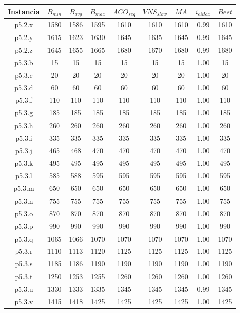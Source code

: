 \begin{table}
\begin{center}
\begin{tabular}{ |c|c|c|c|c|c|c|c|c| } 
\hline
Instancia & $B_{min}$ & $B_{avg}$ & $B_{max}$ & $ACO_{seq}$ & $VNS_{slow}$ & $MA$ & $i_{eMax}$ & $Best$ \\
\hline
p5.2.x & 1580 & 1586 & 1595 & 1610 & 1610 & 1610 & 0.99 & 1610 \\
p5.2.y & 1615 & 1623 & 1630 & 1645 & 1635 & 1645 & 0.99 & 1645 \\
p5.2.z & 1645 & 1655 & 1665 & 1680 & 1670 & 1680 & 0.99 & 1680 \\
p5.3.b & 15 & 15 & 15 & 15 & 15 & 15 & 1.00 & 15 \\
p5.3.c & 20 & 20 & 20 & 20 & 20 & 20 & 1.00 & 20 \\
p5.3.d & 60 & 60 & 60 & 60 & 60 & 60 & 1.00 & 60 \\
p5.3.f & 110 & 110 & 110 & 110 & 110 & 110 & 1.00 & 110 \\
p5.3.g & 185 & 185 & 185 & 185 & 185 & 185 & 1.00 & 185 \\
p5.3.h & 260 & 260 & 260 & 260 & 260 & 260 & 1.00 & 260 \\
p5.3.i & 335 & 335 & 335 & 335 & 335 & 335 & 1.00 & 335 \\
p5.3.j & 465 & 468 & 470 & 470 & 470 & 470 & 1.00 & 470 \\
p5.3.k & 495 & 495 & 495 & 495 & 495 & 495 & 1.00 & 495 \\
p5.3.l & 585 & 588 & 595 & 595 & 595 & 595 & 1.00 & 595 \\
p5.3.m & 650 & 650 & 650 & 650 & 650 & 650 & 1.00 & 650 \\
p5.3.n & 755 & 755 & 755 & 755 & 755 & 755 & 1.00 & 755 \\
p5.3.o & 870 & 870 & 870 & 870 & 870 & 870 & 1.00 & 870 \\
p5.3.p & 990 & 990 & 990 & 990 & 990 & 990 & 1.00 & 990 \\
p5.3.q & 1065 & 1066 & 1070 & 1070 & 1070 & 1070 & 1.00 & 1070 \\
p5.3.r & 1110 & 1113 & 1120 & 1125 & 1125 & 1125 & 1.00 & 1125 \\
p5.3.s & 1185 & 1186 & 1190 & 1190 & 1190 & 1190 & 1.00 & 1190 \\
p5.3.t & 1250 & 1253 & 1255 & 1260 & 1260 & 1260 & 1.00 & 1260 \\
p5.3.u & 1330 & 1333 & 1335 & 1345 & 1345 & 1345 & 0.99 & 1345 \\
p5.3.v & 1415 & 1418 & 1425 & 1425 & 1425 & 1425 & 1.00 & 1425 \\

\end{tabular}
\end{center}
\end{table}
